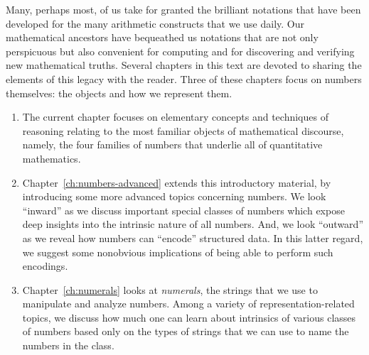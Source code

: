 Many, perhaps most, of us take for granted the brilliant notations that have been developed for the many arithmetic constructs that we use daily.  Our mathematical ancestors have bequeathed us notations that are not only perspicuous but also convenient for computing and for discovering and verifying new mathematical truths.  Several chapters in this text are devoted to sharing the elements of this legacy with the reader.  Three of these chapters focus on numbers themselves: the objects and how we represent them.
\begin{enumerate}
\item
The current chapter focuses on elementary concepts and techniques of reasoning relating to the most familiar objects of mathematical discourse, namely, the four families of numbers that underlie all of quantitative mathematics.
\item
Chapter~\ref{ch:numbers-advanced} extends this introductory material, by introducing some more advanced topics concerning numbers.  We look ``inward'' as we discuss important special classes of numbers which expose deep insights into the intrinsic nature of all numbers.  And, we
look ``outward'' as we reveal how numbers can ``encode'' structured data.  In this latter regard, we suggest some nonobvious implications of being able to perform such encodings.
\item
Chapter~\ref{ch:numerals} looks at {\it numerals}, the strings that we use to manipulate and analyze numbers.  Among a variety of representation-related topics, we discuss how much one can learn about intrinsics of various classes of numbers based only on the types of strings that we can use to name the numbers in the class.
\end{enumerate}
  

\noindent {}

